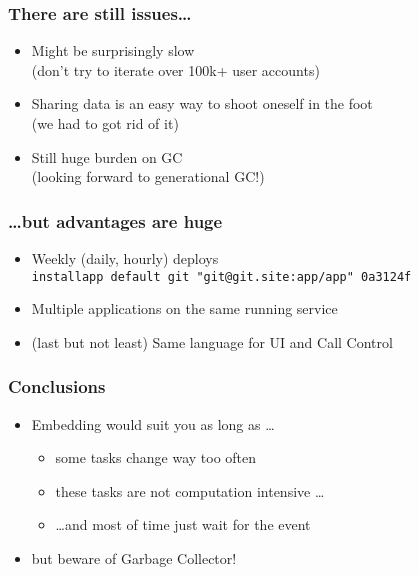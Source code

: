 \documentclass[
   12pt, background = clouds, fonts = fira, 4k
]{itoolabs-beamer}
\begin{document}
\begin{frame}[c]
  \frametitle{There are still issues\ldots}
  \large\begin{itemize}
  \item Might be surprisingly slow\\
    (don't try to iterate over 100k+ user accounts)
    \pause%
  \item Sharing data is an easy way to shoot oneself in the foot\\
    (we had to got rid of it)
    \pause%
  \item Still huge burden on GC\\
    (looking forward to generational GC!)
  \end{itemize}
\end{frame}

\begin{frame}[c]
  \frametitle{\ldots but advantages are huge}
  \large\begin{itemize}
  \item Weekly (daily, hourly) deploys\\
    \pause%
    {\normalsize\texttt{installapp default git "git@git.site:app/app" 0a3124f}}%
    \pause%
  \item Multiple applications on the same running service%
    \pause%
  \item (last but not least) Same language for UI and Call Control
  \end{itemize}
\end{frame}

\begin{frame}[c]
  \frametitle{Conclusions}
  \large\begin{itemize}
  \item Embedding would suit you as long as \ldots
    \pause%
    \begin{itemize}
    \item some tasks change way too often
      \pause%
    \item these tasks are not computation intensive \ldots
      \pause%
    \item \ldots and most of time just wait for the event
      \pause%
    \end{itemize}
  \item but beware of Garbage Collector!
  \end{itemize}
\end{frame}
\end{document}
